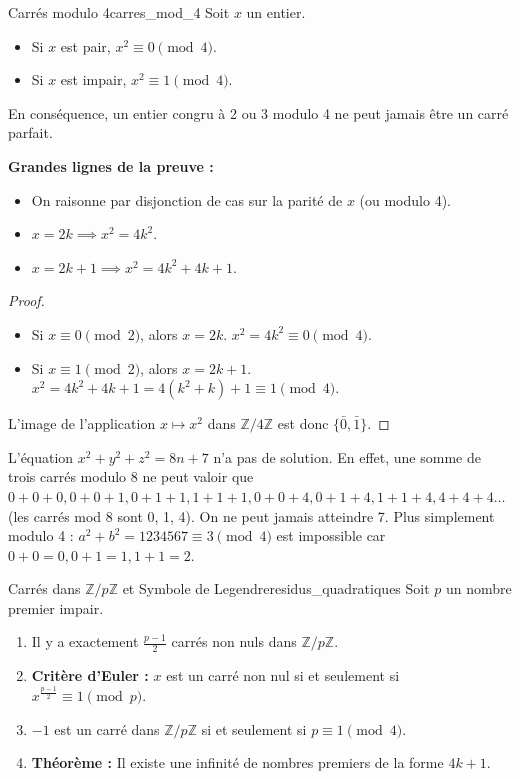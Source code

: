 \documentclass{prepacours}
\begin{document}
\begin{proposition}{Carrés modulo 4}{carres_mod_4}
    Soit $x$ un entier.
    \begin{itemize}
        \item Si $x$ est pair, $x^2 \equiv 0 \pmod 4$.
        \item Si $x$ est impair, $x^2 \equiv 1 \pmod 4$.
    \end{itemize}
    En conséquence, un entier congru à 2 ou 3 modulo 4 ne peut jamais être un carré parfait.
\end{proposition}

\noindent \textbf{Grandes lignes de la preuve :}
\begin{itemize}
    \item On raisonne par disjonction de cas sur la parité de $x$ (ou modulo 4).
    \item $x = 2k \implies x^2 = 4k^2$.
    \item $x = 2k+1 \implies x^2 = 4k^2 + 4k + 1$.
\end{itemize}

\begin{proof}
    \begin{itemize}
        \item Si $x \equiv 0 \pmod 2$, alors $x = 2k$. $x^2 = 4k^2 \equiv 0 \pmod 4$.
        \item Si $x \equiv 1 \pmod 2$, alors $x = 2k+1$. $x^2 = 4k^2 + 4k + 1 = 4(k^2+k) + 1 \equiv 1 \pmod 4$.
    \end{itemize}
    L'image de l'application $x \mapsto x^2$ dans $\mathbb{Z}/4\mathbb{Z}$ est donc $\{\bar{0}, \bar{1}\}$.
\end{proof}

\begin{exemple}
    L'équation $x^2 + y^2 + z^2 = 8n + 7$ n'a pas de solution. En effet, une somme de trois carrés modulo 8 ne peut valoir que $0+0+0, 0+0+1, 0+1+1, 1+1+1, 0+0+4, 0+1+4, 1+1+4, 4+4+4 \dots$ (les carrés mod 8 sont 0, 1, 4). On ne peut jamais atteindre 7.
    Plus simplement modulo 4 : $a^2+b^2 = 1234567 \equiv 3 \pmod 4$ est impossible car $0+0=0, 0+1=1, 1+1=2$.
\end{exemple}

\begin{proposition}{Carrés dans $\mathbb{Z}/p\mathbb{Z}$ et Symbole de Legendre}{residus_quadratiques}
    Soit $p$ un nombre premier impair.
    \begin{enumerate}
        \item Il y a exactement $\frac{p-1}{2}$ carrés non nuls dans $\mathbb{Z}/p\mathbb{Z}$.
        \item \textbf{Critère d'Euler :} $x$ est un carré non nul si et seulement si $x^{\frac{p-1}{2}} \equiv 1 \pmod p$.
        \item $-1$ est un carré dans $\mathbb{Z}/p\mathbb{Z}$ si et seulement si $p \equiv 1 \pmod 4$.
        \item \textbf{Théorème :} Il existe une infinité de nombres premiers de la forme $4k+1$.
    \end{enumerate}
\end{proposition}
\end{document}
